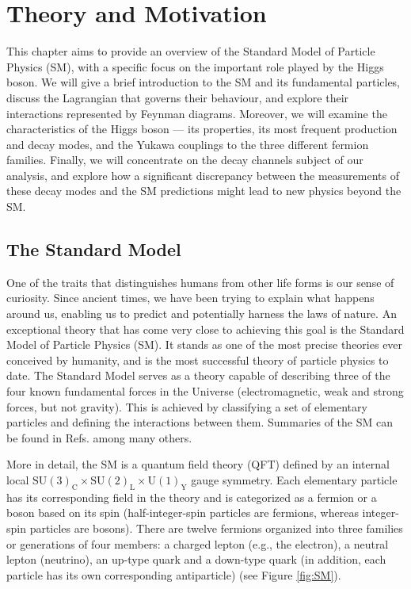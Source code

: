 \chapter[Theory and Motivation]{Theory and Motivation}\label{chap:theory_motivation}

This chapter aims to provide an overview of the Standard Model of Particle Physics (SM), with a specific focus on the important role played by the Higgs boson. We will give a brief introduction to the SM and its fundamental particles, discuss the Lagrangian that governs their behaviour, and explore their interactions represented by Feynman diagrams. Moreover, we will examine the characteristics of the Higgs boson --- its properties, its most frequent production and decay modes, and the Yukawa couplings to the three different fermion families. Finally, we will concentrate on the decay channels subject of our analysis, and explore how a significant discrepancy between the measurements of these decay modes and the SM predictions might lead to new physics beyond the SM.

\section{The Standard Model}\label{sec:SM}

One of the traits that distinguishes humans from other life forms is our sense of curiosity. Since ancient times, we have been trying to explain what happens around us, enabling us to predict and potentially harness the laws of nature. An exceptional theory that has come very close to achieving this goal is the Standard Model of Particle Physics (SM). It stands as one of the most precise theories ever conceived by humanity, and is the most successful theory of particle physics to date. The Standard Model serves as a theory capable of describing three of the four known fundamental forces in the Universe (electromagnetic, weak and strong forces, but not gravity). This is achieved by classifying a set of elementary particles and defining the interactions between them. Summaries of the SM can be found in Refs. \cite{Perkins:1982xb, Peskin:1995ev} among many others.

More in detail, the SM is a quantum field theory (QFT) defined by an internal local $\text{SU}(3)_{\text{C}}\times \text{SU}(2)_{\text{L}}\times \text{U}(1)_{\text{Y}}$ gauge symmetry. Each elementary particle has its corresponding field in the theory and is categorized as a fermion or a boson based on its spin (half-integer-spin particles are fermions, whereas integer-spin particles are bosons). There are twelve fermions organized into three families or generations of four members: a charged lepton (e.g., the electron), a neutral lepton (neutrino), an up-type quark and a down-type quark (in addition, each particle has its own corresponding antiparticle) (see Figure \ref{fig:SM}).

